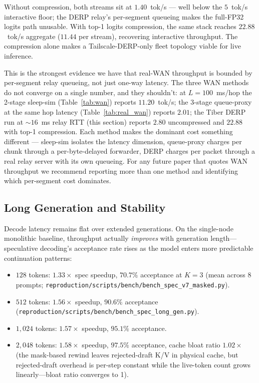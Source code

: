 \documentclass[11pt]{article}
\newcommand{\brk}{\discretionary{}{}{}}
\begin{document}
Without compression, both streams sit at $1.40$~tok/s --- well below the $5$~tok/s interactive floor; the DERP relay's per-segment queueing makes the full-FP32 logits path unusable. With top-1 logits compression, the same stack reaches $22.88$~tok/s aggregate ($11.44$ per stream), recovering interactive throughput. The compression alone makes a Tailscale-DERP-only fleet topology viable for live inference.

This is the strongest evidence we have that real-WAN throughput is bounded by per-segment relay queueing, not just one-way latency. The three WAN methods do not converge on a single number, and they shouldn't: at $L\!=\!100$~ms/hop the 2-stage sleep-sim (Table~\ref{tab:wan}) reports $11.20$~tok/s; the 3-stage queue-proxy at the same hop latency (Table~\ref{tab:real_wan}) reports $2.01$; the Tiber DERP run at ${\sim}16$~ms relay RTT (this section) reports $2.80$ uncompressed and $22.88$ with top-1 compression. Each method makes the dominant cost something different --- sleep-sim isolates the latency dimension, queue-proxy charges per chunk through a per-byte-delayed forwarder, DERP charges per packet through a real relay server with its own queueing. For any future paper that quotes WAN throughput we recommend reporting more than one method and identifying which per-segment cost dominates.

\subsection{Long Generation and Stability}

Decode latency remains flat over extended generations. On the single-node monolithic baseline, throughput actually \emph{improves} with generation length---speculative decoding's acceptance rate rises as the model enters more predictable continuation patterns:

\begin{itemize}[leftmargin=*]
  \item $128$ tokens: $1.33\times$ spec speedup, $70.7\%$ acceptance at $K\!=\!3$ (mean across 8 prompts; \texttt{reproduction/\brk scripts/\brk bench/\brk bench\_\brk spec\_\brk v7\_\brk masked.py}).
  \item $512$ tokens: $1.56\times$ speedup, $90.6\%$ acceptance (\texttt{reproduction/\brk scripts/\brk bench/\brk bench\_\brk spec\_\brk long\_\brk gen.py}).
  \item $1{,}024$ tokens: $1.57\times$ speedup, $95.1\%$ acceptance.
  \item $2{,}048$ tokens: $1.58\times$ speedup, $97.5\%$ acceptance, cache bloat ratio $1.02\times$ (the mask-based rewind leaves rejected-draft K/V in physical cache, but rejected-draft overhead is per-step constant while the live-token count grows linearly---bloat ratio converges to 1).
\end{itemize}
\end{document}
